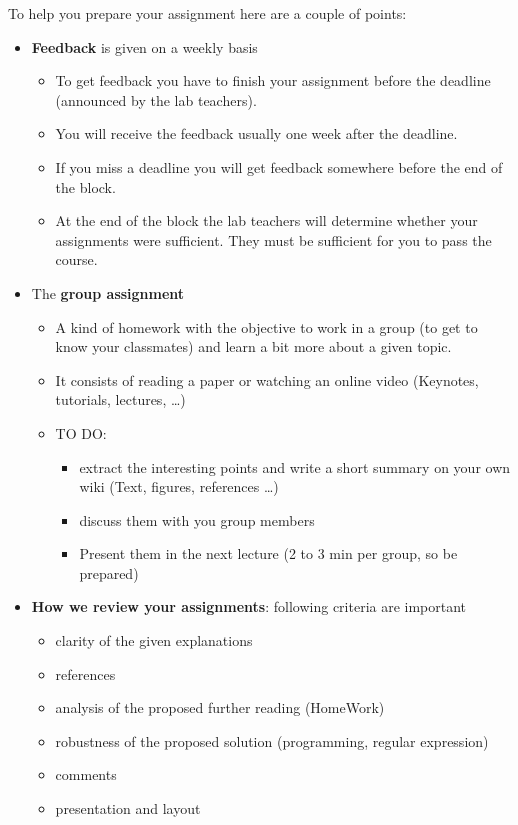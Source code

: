 \documentclass[11pt]{article}
\begin{document}
To help you prepare your assignment here are a couple of points:
\begin{itemize}
  \item \textbf{Feedback} is given on a weekly basis
    \begin{itemize}
      \item To get feedback you have to finish your assignment before the deadline (announced by the lab teachers).
      \item You will receive the feedback usually one week after the deadline.
      \item If you miss a deadline you will get feedback somewhere before the end of the block.
      \item At the end of the block the lab teachers will determine whether your assignments were sufficient. They must be sufficient for you to pass the course.
    \end{itemize}
  \item The \textbf{group assignment}
    \begin{itemize}
      \item A kind of homework with the objective to work in a group (to get to know your classmates) and learn a bit more about a given topic.
      \item It consists of reading a paper or watching an online video (Keynotes, tutorials, lectures, …)
      \item TO DO:
        \begin{itemize}
          \item extract the interesting points and write a short summary on your own wiki (Text, figures, references …)
          \item discuss them with you group members
          \item Present them in the next lecture (2 to 3 min per group, so be prepared)
        \end{itemize}
    \end{itemize}
  \item \textbf{How we review your assignments}: following criteria are important
    \begin{itemize}
      \item clarity of the given explanations
      \item references
      \item analysis of the proposed further reading (HomeWork)
      \item robustness of the proposed solution (programming, regular expression)
      \item comments
      \item presentation and layout
    \end{itemize}
\end{itemize}
\end{document}
